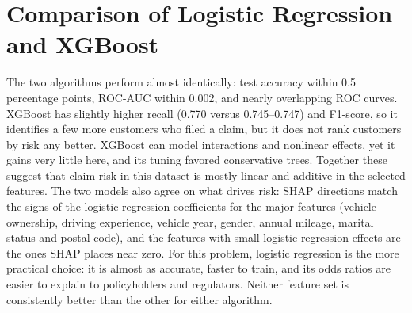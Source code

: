\documentclass[conference]{IEEEtran}
\begin{document}
\section{Comparison of Logistic Regression and XGBoost}
The two algorithms perform almost identically: test accuracy within 0.5 percentage points, ROC-AUC within 0.002, and nearly overlapping ROC curves. XGBoost has slightly higher recall (0.770 versus 0.745--0.747) and F1-score, so it identifies a few more customers who filed a claim, but it does not rank customers by risk any better. XGBoost can model interactions and nonlinear effects, yet it gains very little here, and its tuning favored conservative trees. Together these suggest that claim risk in this dataset is mostly linear and additive in the selected features. The two models also agree on what drives risk: SHAP directions match the signs of the logistic regression coefficients for the major features (vehicle ownership, driving experience, vehicle year, gender, annual mileage, marital status and postal code), and the features with small logistic regression effects are the ones SHAP places near zero. For this problem, logistic regression is the more practical choice: it is almost as accurate, faster to train, and its odds ratios are easier to explain to policyholders and regulators. Neither feature set is consistently better than the other for either algorithm.
\end{document}
